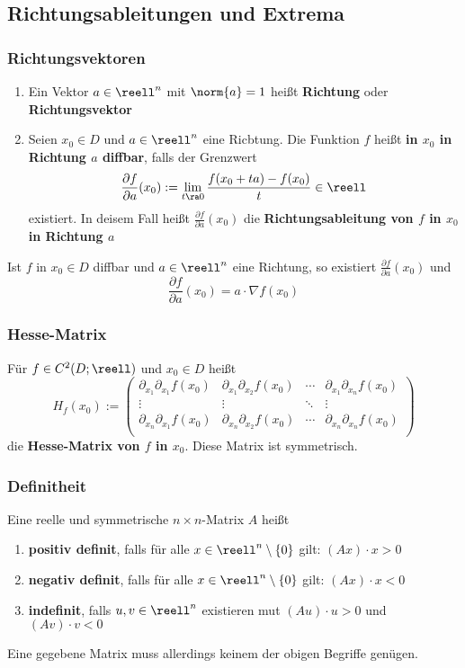 \documentclass{kit}
\begin{document}
  \subsection{Richtungsableitungen und Extrema}
    \subsubsection{Richtungsvektoren}
      \begin{enumerate}
        \item Ein Vektor $a\in\reell^n$ mit $\norm{a}=1$ heißt \textbf{Richtung} oder \textbf{Richtungsvektor}
        \item Seien $x_0\in D$ und $a\in\reell^n$ eine Ricbtung. Die Funktion $f$ heißt \textbf{in $x_0$ in Richtung $a$
          diffbar}, falls der Grenzwert
          $$\frac{\partial f}{\partial a}(x_0):=\lim_{t\ra0}\frac{f(x_0+ta)-f(x_0)}{t}\in\reell$$
          existiert. In deisem Fall heißt $\frac{\partial f}{\partial a}(x_0)$ die \textbf{Richtungsableitung von $f$ in 
          $x_0$ in Richtung $a$}
      \end{enumerate}
      Ist $f$ in $x_0\in D$ diffbar und $a\in\reell^n$ eine Richtung, so existiert $\frac{\partial f}{\partial a}(x_0)$ und
      $$\frac{\partial f}{\partial a}(x_0)=a\cdot\nabla f(x_0)$$
    \subsubsection{Hesse-Matrix}
      Für $f\in C^2(D;\reell)$ und $x_0\in D$ heißt
      $$H_f(x_0):=\begin{pmatrix}
        \partial_{x_1}\partial_{x_1}f(x_0) & \partial_{x_1}\partial_{x_2}f(x_0) & \cdots & 
        \partial_{x_1}\partial_{x_n}f(x_0)\\
        \vdots & \vdots & \ddots & \vdots\\
        \partial_{x_n}\partial_{x_1}f(x_0) & \partial_{x_n}\partial_{x_2}f(x_0) & \cdots & 
        \partial_{x_n}\partial_{x_n}f(x_0)\\
      \end{pmatrix}$$
      die \textbf{Hesse-Matrix von $f$ in $x_0$}. Diese Matrix ist symmetrisch.
    \subsubsection{Definitheit}
      Eine reelle und symmetrische $n\times n$-Matrix $A$ heißt
      \begin{enumerate}
        \item \textbf{positiv definit}, falls für alle $x\in\reell^n\setminus\{0\}$ gilt: $(Ax)\cdot x>0$
        \item \textbf{negativ definit}, falls für alle $x\in\reell^n\setminus\{0\}$ gilt: $(Ax)\cdot x<0$
        \item \textbf{indefinit}, falls $u,v\in\reell^n$ existieren mut $(Au)\cdot u>0$ und $(Av)\cdot v<0$
      \end{enumerate}
      Eine gegebene Matrix muss allerdings keinem der obigen Begriffe genügen.
\end{document}
